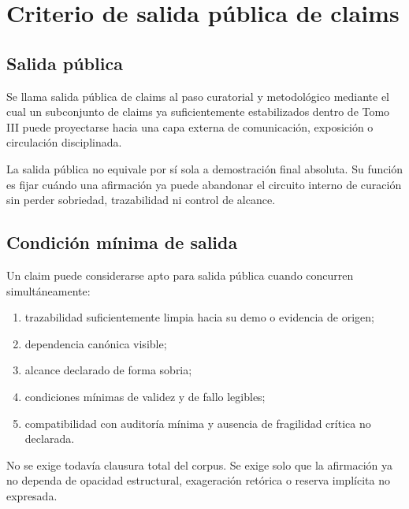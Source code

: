 \chapter{Criterio de salida pública de claims}

\section{Salida pública}
\begin{definition}
Se llama salida pública de claims al paso curatorial y metodológico mediante el cual un subconjunto de claims ya suficientemente estabilizados dentro de Tomo III puede proyectarse hacia una capa externa de comunicación, exposición o circulación disciplinada.
\end{definition}

\begin{observation}
La salida pública no equivale por sí sola a demostración final absoluta. Su función es fijar cuándo una afirmación ya puede abandonar el circuito interno de curación sin perder sobriedad, trazabilidad ni control de alcance.
\end{observation}

\section{Condición mínima de salida}
\begin{definition}
Un claim puede considerarse apto para salida pública cuando concurren simultáneamente:
\begin{enumerate}
  \item trazabilidad suficientemente limpia hacia su demo o evidencia de origen;
  \item dependencia canónica visible;
  \item alcance declarado de forma sobria;
  \item condiciones mínimas de validez y de fallo legibles;
  \item compatibilidad con auditoría mínima y ausencia de fragilidad crítica no declarada.
\end{enumerate}
\end{definition}

\begin{observation}
No se exige todavía clausura total del corpus. Se exige solo que la afirmación ya no dependa de opacidad estructural, exageración retórica o reserva implícita no expresada.
\end{observation}

